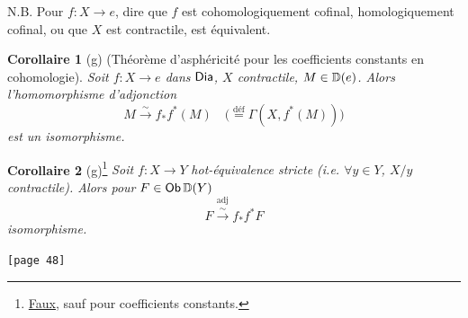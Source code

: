 \noindent N.B. Pour $f : X \to e$, dire que $f$ est cohomologiquement cofinal, homologiquement cofinal, ou que $X$ est contractile, est équivalent.

\noindent\textbf{Corollaire 1} (g) (Théorème d'asphéricité pour les coefficients constants en cohomologie). \textit{Soit $f : X \to e$ dans} $\mathsf{Dia}$\textit{, $X$ contractile, $M \in \mathbb{D}(e)$. Alors l'homomorphisme d'adjonction}
\[ M \xrightarrow{\sim} f_{*} f^{*}(M) \quad \bigl(\overset{\text{déf}}{=} \Gamma(X, f^{*}(M))\bigr) \]
\textit{est un isomorphisme.}

\noindent\textbf{Corollaire 2} (g)\footnote[16]{\underline{Faux}, sauf pour coefficients constants.} \textit{Soit $f : X \to Y$} \textit{hot-équivalence stricte (i.e. $\forall y \in Y$, $X/y$ contractile). Alors pour $F \in \mathsf{Ob}\,\mathbb{D}(Y)$}
\[ F \overset{\text{adj}}{\xrightarrow{\sim}} f_{*} f^{*} F \]
 \textit{isomorphisme.}

\noindent{}\texttt{[page 48]}


